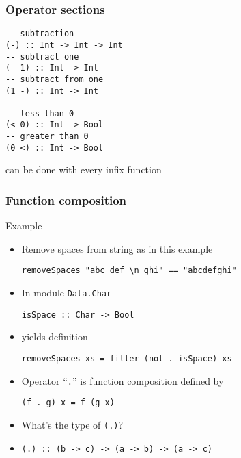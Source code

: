 \documentclass{beamer}
\begin{document}
\begin{frame}[fragile]
  \frametitle{Operator sections}
\begin{verbatim}
-- subtraction
(-) :: Int -> Int -> Int
-- subtract one
(- 1) :: Int -> Int
-- subtract from one
(1 -) :: Int -> Int

-- less than 0
(< 0) :: Int -> Bool
-- greater than 0
(0 <) :: Int -> Bool
\end{verbatim}
  can be done with every infix function
\end{frame}
\begin{frame}[fragile]
  \frametitle{Function composition}
  \begin{block}{Example}
    \begin{itemize}
    \item<+-> Remove spaces from string as in this
      example
\begin{verbatim}
removeSpaces "abc def \n ghi" == "abcdefghi"
\end{verbatim}
    \item<+-> In module \texttt{Data.Char}
\begin{verbatim}
isSpace :: Char -> Bool
\end{verbatim}
    \item<+-> yields definition
\begin{verbatim}
removeSpaces xs = filter (not . isSpace) xs
\end{verbatim}
    \item<+-> Operator ``\texttt{.}'' is function composition defined by
\begin{verbatim}
(f . g) x = f (g x)
\end{verbatim}
    \item<+-> What's the type of \texttt{(.)}?
    \item<+-> \texttt{(.) :: (b -> c) -> (a -> b) -> (a -> c)}
    \end{itemize}
  \end{block}
\end{frame}
\end{document}
